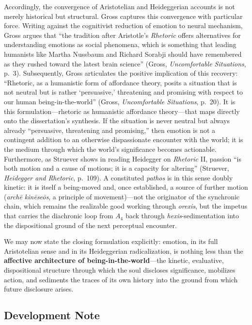 \documentclass{article}
\begin{document}
Accordingly, the convergence of Aristotelian and Heideggerian accounts is not merely historical but structural. Gross captures this convergence with particular force. Writing against the cognitivist reduction of emotion to neural mechanism, Gross argues that ``the tradition after Aristotle's \textit{Rhetoric} offers alternatives for understanding emotions as social phenomena, which is something that leading humanists like Martha Nussbaum and Richard Sorabji should have remembered as they rushed toward the latest brain science'' (Gross, \textit{Uncomfortable Situations}, p.~3). Subsequently, Gross articulates the positive implication of this recovery: ``Rhetoric, as a humanistic form of affordance theory, posits a situation that is not neutral but is rather `persuasive,' threatening and promising with respect to our human being-in-the-world'' (Gross, \textit{Uncomfortable Situations}, p.~20). It is this formulation---rhetoric as humanistic affordance theory---that maps directly onto the dissertation's synthesis. If the situation is never neutral but always already ``persuasive, threatening and promising,'' then emotion is not a contingent addition to an otherwise dispassionate encounter with the world; it is the medium through which the world's significance becomes actionable. Furthermore, as Struever shows in reading Heidegger on \textit{Rhetoric} II, passion ``is both motion and a cause of motions; it is a capacity for altering'' (Struever, \textit{Heidegger and Rhetoric}, p.~109). A constituted \textit{pathos} is in this sense doubly kinetic: it is itself a being-moved and, once established, a source of further motion (\textit{archē kinēseōs}, a principle of movement)---not the originator of the synchronic chain, which remains the realizable good working through \textit{orexis}, but the impetus that carries the diachronic loop from $A_4$ back through \textit{hexis}-sedimentation into the dispositional ground of the next perceptual encounter.

We may now state the closing formulation explicitly: emotion, in its full Aristotelian sense and in its Heideggerian radicalization, is nothing less than the \textbf{affective architecture of being-in-the-world}---the kinetic, evaluative, dispositional structure through which the soul discloses significance, mobilizes action, and sediments the traces of its own history into the ground from which future disclosure arises.


\subsection*{Development Note}
\end{document}
